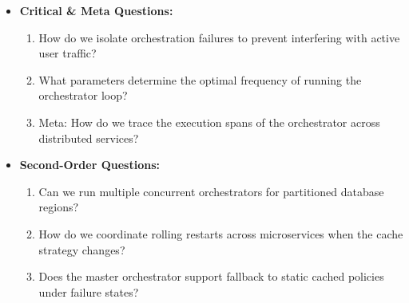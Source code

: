 \documentclass[11pt,a4paper]{article}
\theoremstyle{definition}
\begin{document}
\begin{itemize}[leftmargin=*]
\begin{itemize}
      \item \textbf{Outputs:} Status deployment execution signals.
    \end{itemize}
  \item[] \textbf{Critical \& Meta Questions:}
  \begin{enumerate}
    \item How do we isolate orchestration failures to prevent interfering with active user traffic?
    \item What parameters determine the optimal frequency of running the orchestrator loop?
    \item Meta: How do we trace the execution spans of the orchestrator across distributed services?
  \end{enumerate}
  \item[] \textbf{Second-Order Questions:}
  \begin{enumerate}
    \item Can we run multiple concurrent orchestrators for partitioned database regions?
    \item How do we coordinate rolling restarts across microservices when the cache strategy changes?
    \item Does the master orchestrator support fallback to static cached policies under failure states?
  \end{enumerate}
\end{itemize}
\medskip
\end{document}
